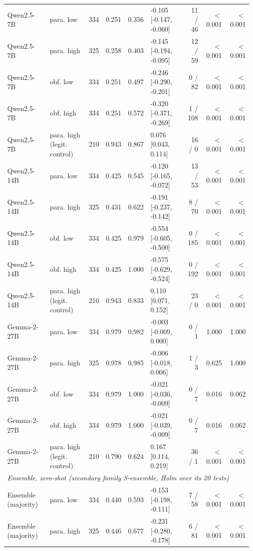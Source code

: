 \begin{tabular}{llrrrlrrr}
Qwen2.5-7B & para. low & 334 & 0.251 & 0.356 & -0.105 [-0.147, -0.060] & 11 / 46 & $<$0.001 & $<$0.001 \\
Qwen2.5-7B & para. high & 325 & 0.258 & 0.403 & -0.145 [-0.194, -0.095] & 12 / 59 & $<$0.001 & $<$0.001 \\
Qwen2.5-7B & obf. low & 334 & 0.251 & 0.497 & -0.246 [-0.290, -0.201] & 0 / 82 & $<$0.001 & $<$0.001 \\
Qwen2.5-7B & obf. high & 334 & 0.251 & 0.572 & -0.320 [-0.371, -0.269] & 1 / 108 & $<$0.001 & $<$0.001 \\
Qwen2.5-7B & para. high (legit. control) & 210 & 0.943 & 0.867 & 0.076 [0.043, 0.114] & 16 / 0 & $<$0.001 & $<$0.001 \\
Qwen2.5-14B & para. low & 334 & 0.425 & 0.545 & -0.120 [-0.165, -0.072] & 13 / 53 & $<$0.001 & $<$0.001 \\
Qwen2.5-14B & para. high & 325 & 0.431 & 0.622 & -0.191 [-0.237, -0.142] & 8 / 70 & $<$0.001 & $<$0.001 \\
Qwen2.5-14B & obf. low & 334 & 0.425 & 0.979 & -0.554 [-0.605, -0.500] & 0 / 185 & $<$0.001 & $<$0.001 \\
Qwen2.5-14B & obf. high & 334 & 0.425 & 1.000 & -0.575 [-0.629, -0.524] & 0 / 192 & $<$0.001 & $<$0.001 \\
Qwen2.5-14B & para. high (legit. control) & 210 & 0.943 & 0.833 & 0.110 [0.071, 0.152] & 23 / 0 & $<$0.001 & $<$0.001 \\
Gemma-2-27B & para. low & 334 & 0.979 & 0.982 & -0.003 [-0.009, 0.000] & 0 / 1 & 1.000 & 1.000 \\
Gemma-2-27B & para. high & 325 & 0.978 & 0.985 & -0.006 [-0.018, 0.006] & 1 / 3 & 0.625 & 1.000 \\
Gemma-2-27B & obf. low & 334 & 0.979 & 1.000 & -0.021 [-0.036, -0.009] & 0 / 7 & 0.016 & 0.062 \\
Gemma-2-27B & obf. high & 334 & 0.979 & 1.000 & -0.021 [-0.039, -0.009] & 0 / 7 & 0.016 & 0.062 \\
Gemma-2-27B & para. high (legit. control) & 210 & 0.790 & 0.624 & 0.167 [0.114, 0.219] & 36 / 1 & $<$0.001 & $<$0.001 \\
\midrule
\multicolumn{9}{l}{\textit{Ensemble, zero-shot (secondary family S-ensemble, Holm over its 20 tests)}} \\
Ensemble (majority) & para. low & 334 & 0.440 & 0.593 & -0.153 [-0.198, -0.111] & 7 / 58 & $<$0.001 & $<$0.001 \\
Ensemble (majority) & para. high & 325 & 0.446 & 0.677 & -0.231 [-0.280, -0.178] & 6 / 81 & $<$0.001 & $<$0.001 \\

\end{tabular}
